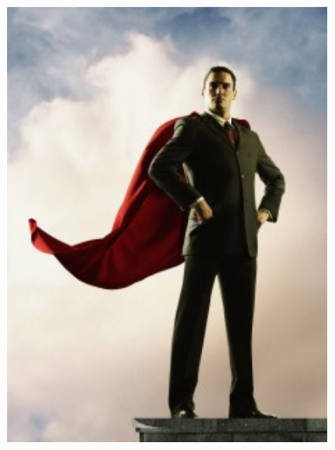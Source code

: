\documentclass{../../slides-style}
\begin{document}
\begin{frame}
\begin{columns}
\begin{column}{0.3\textwidth}
\begin{center}
                    \includegraphics[width=0.8\textwidth]{productOwner.png}
                \end{center}
            \end{column}
        \end{columns}
    \end{frame}
\end{document}
